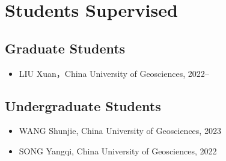 \section{Students Supervised}

\subsection{Graduate Students}
\begin{itemize}
\item LIU Xuan，China University of Geosciences, 2022--
\end{itemize}

\subsection{Undergraduate Students}
\begin{itemize}
\item WANG Shunjie, China University of Geosciences, 2023
\item SONG Yangqi, China University of Geosciences, 2022
\end{itemize}
